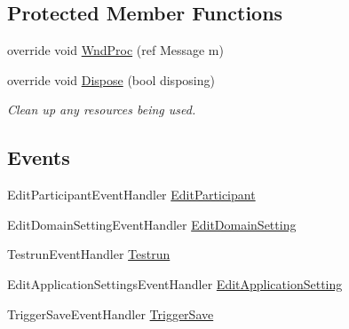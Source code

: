 \subsection*{Protected Member Functions}
\begin{DoxyCompactItemize}
\item 
override void \hyperlink{class_web_analyzer_1_1_u_i_1_1_h_t_m_l_u_i_a69b6ae98230372240893525305c0f4c2}{Wnd\+Proc} (ref Message m)
\item 
override void \hyperlink{class_web_analyzer_1_1_u_i_1_1_h_t_m_l_u_i_a8f64d2d40440500ce68bea7174c191bb}{Dispose} (bool disposing)
\begin{DoxyCompactList}\small\item\em Clean up any resources being used. \end{DoxyCompactList}\end{DoxyCompactItemize}
\subsection*{Events}
\begin{DoxyCompactItemize}
\item 
Edit\+Participant\+Event\+Handler \hyperlink{class_web_analyzer_1_1_u_i_1_1_h_t_m_l_u_i_a41d7bba18de0e030779e1bc57de9d267}{Edit\+Participant}
\item 
Edit\+Domain\+Setting\+Event\+Handler \hyperlink{class_web_analyzer_1_1_u_i_1_1_h_t_m_l_u_i_aec067a24868c0ce06c3dd5ca4caccd8b}{Edit\+Domain\+Setting}
\item 
Testrun\+Event\+Handler \hyperlink{class_web_analyzer_1_1_u_i_1_1_h_t_m_l_u_i_adb77cf3b6fe81466fc13561570764024}{Testrun}
\item 
Edit\+Application\+Settings\+Event\+Handler \hyperlink{class_web_analyzer_1_1_u_i_1_1_h_t_m_l_u_i_ab0a670a0a2407499af7b073c9f180657}{Edit\+Application\+Setting}
\item 
Trigger\+Save\+Event\+Handler \hyperlink{class_web_analyzer_1_1_u_i_1_1_h_t_m_l_u_i_a88837323ee334b87422f0d8cf1897952}{Trigger\+Save}
\end{DoxyCompactItemize}
